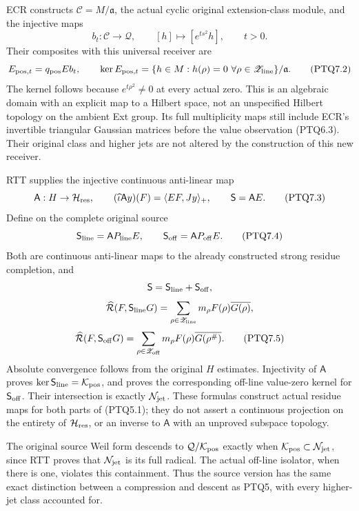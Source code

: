 ECR constructs \(\mathscr C=M/\mathfrak a\), the actual cyclic original
extension-class module, and the injective maps \[
b_t:\mathscr C\to\mathcal Q,\qquad[h]\mapsto[e^{ts^2}h],\qquad t>0.
\tag{PTQ7.1}
\] Their composites with this universal receiver are \[
E_{{\rm pos},t}=q_{\rm pos}Eb_t,
\qquad
\ker E_{{\rm pos},t}
=\{h\in M:h(\rho)=0\ \forall\rho\in\mathscr Z_{\rm line}\}/\mathfrak a.
\tag{PTQ7.2}
\] The kernel follows because \(e^{t\rho^2}\ne0\) at every actual zero.
This is an algebraic domain with an explicit map to a Hilbert space, not
an unspecified Hilbert topology on the ambient Ext group. Its full
multiplicity maps still include ECR's invertible triangular Gaussian
matrices before the value observation (PTQ6.3). Their original class and
higher jets are not altered by the construction of this new receiver.

RTT supplies the injective continuous anti-linear map \[
\mathsf A:H\to\mathcal H_{\rm res},\qquad
(\widehat\iota\mathsf Ay)(F)=\langle EF,Jy\rangle_+,
\qquad\mathsf S=\mathsf A E.
\tag{PTQ7.3}
\] Define on the complete original source \[
\mathsf S_{\rm line}=\mathsf A P_{\rm line}E,
\qquad\mathsf S_{\rm off}=\mathsf A P_{\rm off}E.
\tag{PTQ7.4}
\] Both are continuous anti-linear maps to the already constructed
strong residue completion, and \[
\mathsf S=\mathsf S_{\rm line}+\mathsf S_{\rm off},
\] \[
\widehat{\mathcal R}(F,\mathsf S_{\rm line}G)
=\sum_{\rho\in\mathscr Z_{\rm line}}m_\rho F(\rho)\overline{G(\rho)},
\] \[
\widehat{\mathcal R}(F,\mathsf S_{\rm off}G)
=\sum_{\rho\in\mathscr Z_{\rm off}}
m_\rho F(\rho)\overline{G(\rho^\#)}.
\tag{PTQ7.5}
\] Absolute convergence follows from the original \(H\) estimates.
Injectivity of \(\mathsf A\) proves
\(\ker\mathsf S_{\rm line}=\mathcal K_{\rm pos}\), and proves the
corresponding off-line value-zero kernel for \(\mathsf S_{\rm off}\).
Their intersection is exactly \(\mathcal N_{\rm jet}\). These formulas
construct actual residue maps for both parts of (PTQ5.1); they do not
assert a continuous projection on the entirety of
\(\mathcal H_{\rm res}\), or an inverse to \(\mathsf A\) with an
unproved subspace topology.

The original source Weil form descends to
\(\mathcal Q/\mathcal K_{\rm pos}\) exactly when
\(\mathcal K_{\rm pos}\subset\mathcal N_{\rm jet}\), since RTT proves
that \(\mathcal N_{\rm jet}\) is its full radical. The actual off-line
isolator, when there is one, violates this containment. Thus the source
version has the same exact distinction between a compression and descent
as PTQ5, with every higher-jet class accounted for.

